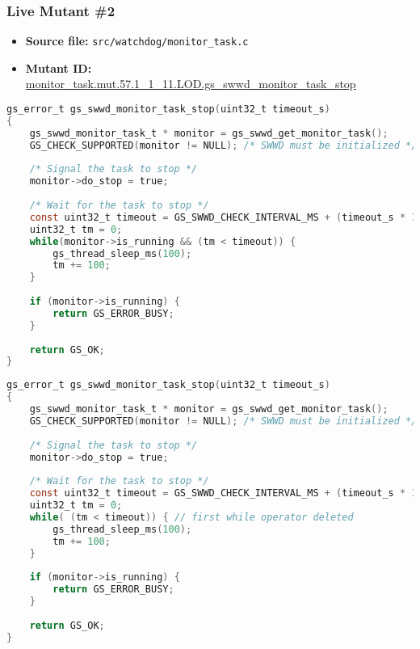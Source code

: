 \subsubsection{Live Mutant \#2}

\begin{itemize}
\item \textbf{Source file:} \texttt{src/watchdog/monitor\_task.c}
\item \textbf{Mutant ID:} \url{monitor_task.mut.57.1_1_11.LOD.gs_swwd_monitor_task_stop}
\end{itemize}

\begin{lstlisting}[language=C, label=live_2, caption=Original source code.]
gs_error_t gs_swwd_monitor_task_stop(uint32_t timeout_s)
{
    gs_swwd_monitor_task_t * monitor = gs_swwd_get_monitor_task();
    GS_CHECK_SUPPORTED(monitor != NULL); /* SWWD must be initialized */
 
    /* Signal the task to stop */
    monitor->do_stop = true;
 
    /* Wait for the task to stop */                                                                                                  
    const uint32_t timeout = GS_SWWD_CHECK_INTERVAL_MS + (timeout_s * 1000);
    uint32_t tm = 0;
    while(monitor->is_running && (tm < timeout)) {
        gs_thread_sleep_ms(100);
        tm += 100;
    }
 
    if (monitor->is_running) {
        return GS_ERROR_BUSY;
    }
 
    return GS_OK;
}
\end{lstlisting}

\begin{lstlisting}[language=C, label=live_2, caption=Mutant source code.]
gs_error_t gs_swwd_monitor_task_stop(uint32_t timeout_s)
{
    gs_swwd_monitor_task_t * monitor = gs_swwd_get_monitor_task();
    GS_CHECK_SUPPORTED(monitor != NULL); /* SWWD must be initialized */
 
    /* Signal the task to stop */
    monitor->do_stop = true;
 
    /* Wait for the task to stop */                                                                                                  
    const uint32_t timeout = GS_SWWD_CHECK_INTERVAL_MS + (timeout_s * 1000);
    uint32_t tm = 0;
    while( (tm < timeout)) { // first while operator deleted
        gs_thread_sleep_ms(100);
        tm += 100;
    }
 
    if (monitor->is_running) {
        return GS_ERROR_BUSY;
    }
 
    return GS_OK;
}
\end{lstlisting}


